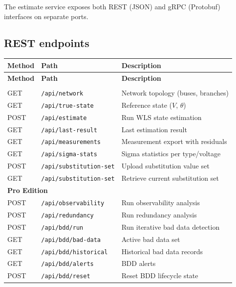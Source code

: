 \documentclass[11pt,a4paper]{article}
\begin{document}
The estimate service exposes both REST (JSON) and gRPC (Protobuf)
interfaces on separate ports.

\subsection{REST endpoints}

\begin{longtable}{llp{48mm}}
  \toprule
  \textbf{Method} & \textbf{Path} & \textbf{Description} \\
  \midrule
  \endfirsthead
  \toprule
  \textbf{Method} & \textbf{Path} & \textbf{Description} \\
  \midrule
  \endhead
  \bottomrule
  \endfoot

  \multicolumn{3}{l}{\textbf{Free Edition}} \\
  \midrule
  GET  & \texttt{/api/network}           & Network topology (buses, branches) \\
  GET  & \texttt{/api/true-state}        & Reference state ($V$, $\theta$) \\
  POST & \texttt{/api/estimate}          & Run WLS state estimation \\
  GET  & \texttt{/api/last-result}       & Last estimation result \\
  GET  & \texttt{/api/measurements}      & Measurement export with residuals \\
  GET  & \texttt{/api/sigma-stats}       & Sigma statistics per type/voltage \\
  POST & \texttt{/api/substitution-set}  & Upload substitution value set \\
  GET  & \texttt{/api/substitution-set}  & Retrieve current substitution set \\
  \midrule
  \multicolumn{3}{l}{\textbf{Pro Edition}} \\
  \midrule
  POST & \texttt{/api/observability}     & Run observability analysis \\
  POST & \texttt{/api/redundancy}        & Run redundancy analysis \\
  POST & \texttt{/api/bdd/run}           & Run iterative bad data detection \\
  GET  & \texttt{/api/bdd/bad-data}      & Active bad data set \\
  GET  & \texttt{/api/bdd/historical}    & Historical bad data records \\
  GET  & \texttt{/api/bdd/alerts}        & BDD alerts \\
  POST & \texttt{/api/bdd/reset}         & Reset BDD lifecycle state \\
\end{longtable}
\end{document}
